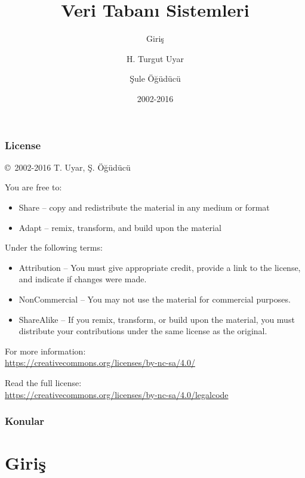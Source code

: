 \documentclass[dvipsnames]{beamer}
\title{Veri Tabanı Sistemleri}
\subtitle{Giriş}
\author{H. Turgut Uyar \and Şule Öğüdücü}
\date{2002-2016}
\theoremstyle{plain}
\begin{document}
\begin{frame}
  \titlepage
\end{frame}

\begin{frame}
  \frametitle{License}

 \hfill
  \copyright~2002-2016 T. Uyar, Ş. Öğüdücü

  \vfill
  \begin{footnotesize}
    You are free to:
    \begin{itemize}
      \itemsep0em
      \item Share -- copy and redistribute the material in any medium or format
      \item Adapt -- remix, transform, and build upon the material
    \end{itemize}

    Under the following terms:
    \begin{itemize}
      \itemsep0em
      \item Attribution -- You must give appropriate credit, provide a link to
        the license, and indicate if changes were made.

      \item NonCommercial -- You may not use the material for commercial
        purposes.

      \item ShareAlike -- If you remix, transform, or build upon the material,
        you must distribute your contributions under the same license as the
        original.
    \end{itemize}
  \end{footnotesize}

  \begin{small}
    For more information:\\
    \url{https://creativecommons.org/licenses/by-nc-sa/4.0/}

    \smallskip
    Read the full license:\\
    \url{https://creativecommons.org/licenses/by-nc-sa/4.0/legalcode}
  \end{small}
\end{frame}

\begin{frame}
  \frametitle{Konular}
  \tableofcontents
\end{frame}

\section{Giriş}
\end{document}
